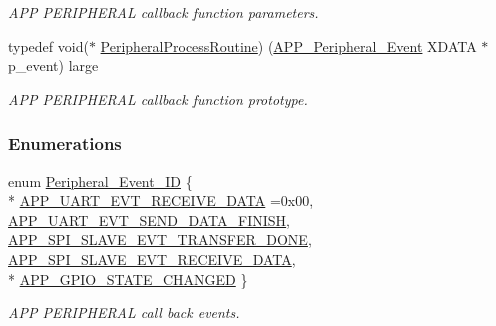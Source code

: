 \begin{DoxyCompactItemize}
\begin{DoxyCompactList}\small\item\em A\+PP P\+E\+R\+I\+P\+H\+E\+R\+AL callback function parameters. \end{DoxyCompactList}\item 
typedef void($\ast$ \hyperlink{group___a_p_p___p_e_r_i_p_h_e_r_a_l_ga2d5e3f5799fd99d38b333c322c4fa536}{Peripheral\+Process\+Routine}) (\hyperlink{struct_a_p_p___peripheral___event}{A\+P\+P\+\_\+\+Peripheral\+\_\+\+Event} X\+D\+A\+TA $\ast$p\+\_\+event) large\hypertarget{group___a_p_p___p_e_r_i_p_h_e_r_a_l_ga2d5e3f5799fd99d38b333c322c4fa536}{}\label{group___a_p_p___p_e_r_i_p_h_e_r_a_l_ga2d5e3f5799fd99d38b333c322c4fa536}

\begin{DoxyCompactList}\small\item\em A\+PP P\+E\+R\+I\+P\+H\+E\+R\+AL callback function prototype. \end{DoxyCompactList}\end{DoxyCompactItemize}
\subsubsection*{Enumerations}
\begin{DoxyCompactItemize}
\item 
enum \hyperlink{group___a_p_p___p_e_r_i_p_h_e_r_a_l_ga0bafa1da04bd0103ec3e3f4ef8316d2e}{Peripheral\+\_\+\+Event\+\_\+\+ID} \{ \\*
\hyperlink{group___a_p_p___p_e_r_i_p_h_e_r_a_l_gga0bafa1da04bd0103ec3e3f4ef8316d2eab818feb1aad304ee10524fd330b8828a}{A\+P\+P\+\_\+\+U\+A\+R\+T\+\_\+\+E\+V\+T\+\_\+\+R\+E\+C\+E\+I\+V\+E\+\_\+\+D\+A\+TA} =0x00, 
\hyperlink{group___a_p_p___p_e_r_i_p_h_e_r_a_l_gga0bafa1da04bd0103ec3e3f4ef8316d2eaea09df7e7d180f6fd573a1cb31077820}{A\+P\+P\+\_\+\+U\+A\+R\+T\+\_\+\+E\+V\+T\+\_\+\+S\+E\+N\+D\+\_\+\+D\+A\+T\+A\+\_\+\+F\+I\+N\+I\+SH}, 
\hyperlink{group___a_p_p___p_e_r_i_p_h_e_r_a_l_gga0bafa1da04bd0103ec3e3f4ef8316d2eafe703d7fe14db05abf02cd2d0cdf3c2d}{A\+P\+P\+\_\+\+S\+P\+I\+\_\+\+S\+L\+A\+V\+E\+\_\+\+E\+V\+T\+\_\+\+T\+R\+A\+N\+S\+F\+E\+R\+\_\+\+D\+O\+NE}, 
\hyperlink{group___a_p_p___p_e_r_i_p_h_e_r_a_l_gga0bafa1da04bd0103ec3e3f4ef8316d2eac99c80921065cc4acf140fef1f8856a5}{A\+P\+P\+\_\+\+S\+P\+I\+\_\+\+S\+L\+A\+V\+E\+\_\+\+E\+V\+T\+\_\+\+R\+E\+C\+E\+I\+V\+E\+\_\+\+D\+A\+TA}, 
\\*
\hyperlink{group___a_p_p___p_e_r_i_p_h_e_r_a_l_gga0bafa1da04bd0103ec3e3f4ef8316d2eade1bb6fb4af540e1e767b3716ed0ed7e}{A\+P\+P\+\_\+\+G\+P\+I\+O\+\_\+\+S\+T\+A\+T\+E\+\_\+\+C\+H\+A\+N\+G\+ED}
 \}\begin{DoxyCompactList}\small\item\em A\+PP P\+E\+R\+I\+P\+H\+E\+R\+AL call back events. \end{DoxyCompactList}
\end{DoxyCompactItemize}
